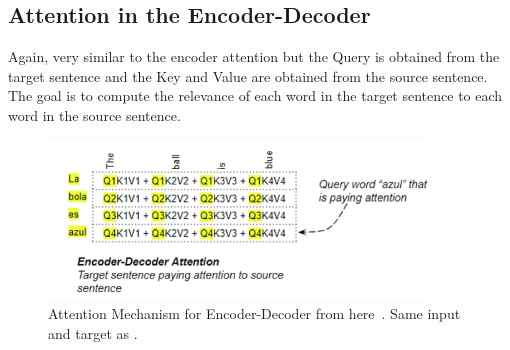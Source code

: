 \subsection{Attention in the Encoder-Decoder}
Again, very similar to the encoder attention but the Query is obtained from the target sentence and the Key and Value are obtained from the
source sentence. The goal is to compute the relevance of each word in the target sentence to each word in the source sentence.
\begin{figure}[H]
	\centering
	\includegraphics[width=0.9\textwidth]{figures/encoder_decoder_atn.png}
	\caption{Attention Mechanism for Encoder-Decoder from here~\autocite{doshiTransformersExplainedVisually2021b}. Same input
		and target as .}
	\label{fig:atn_encoder_decoder}
\end{figure}
